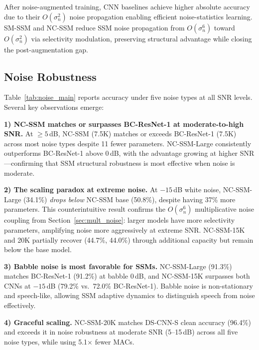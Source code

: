 \documentclass[journal]{IEEEtran}
\begin{document}
After noise-augmented training, CNN baselines achieve higher absolute accuracy due to their $O(\sigma_n^2)$ noise propagation enabling efficient noise-statistics learning.
SM-SSM and NC-SSM reduce SSM noise propagation from $O(\sigma_n^6)$ toward $O(\sigma_n^2)$ via selectivity modulation, preserving structural advantage while closing the post-augmentation gap.


\subsection{Noise Robustness}

Table~\ref{tab:noise_main} reports accuracy under five noise types at all SNR levels.
Several key observations emerge:

\smallskip\noindent\textbf{1) NC-SSM matches or surpasses BC-ResNet-1 at moderate-to-high SNR.}
At $\geq 5$\,dB, NC-SSM (7.5K) matches or exceeds BC-ResNet-1 (7.5K) across most noise types despite 11 fewer parameters.
NC-SSM-Large consistently outperforms BC-ResNet-1 above 0\,dB, with the advantage growing at higher SNR---confirming that SSM structural robustness is most effective when noise is moderate.

\smallskip\noindent\textbf{2) The scaling paradox at extreme noise.}
At $-15$\,dB white noise, NC-SSM-Large (34.1\%) \emph{drops below} NC-SSM base (50.8\%), despite having 37\% more parameters.
This counterintuitive result confirms the $O(\sigma_n^6)$ multiplicative noise coupling from Section~\ref{sec:mult_noise}: larger models have more selectivity parameters, amplifying noise more aggressively at extreme SNR.
NC-SSM-15K and 20K partially recover (44.7\%, 44.0\%) through additional capacity but remain below the base model.

\smallskip\noindent\textbf{3) Babble noise is most favorable for SSMs.}
NC-SSM-Large (91.3\%) matches BC-ResNet-1 (91.2\%) at babble 0\,dB, and NC-SSM-15K surpasses both CNNs at $-15$\,dB (79.2\% vs.\ 72.0\% BC-ResNet-1).
Babble noise is non-stationary and speech-like, allowing SSM adaptive dynamics to distinguish speech from noise effectively.

\smallskip\noindent\textbf{4) Graceful scaling.}
NC-SSM-20K matches DS-CNN-S clean accuracy (96.4\%) and exceeds it in noise robustness at moderate SNR (5--15\,dB) across all five noise types, while using 5.1$\times$ fewer MACs.
\end{document}
